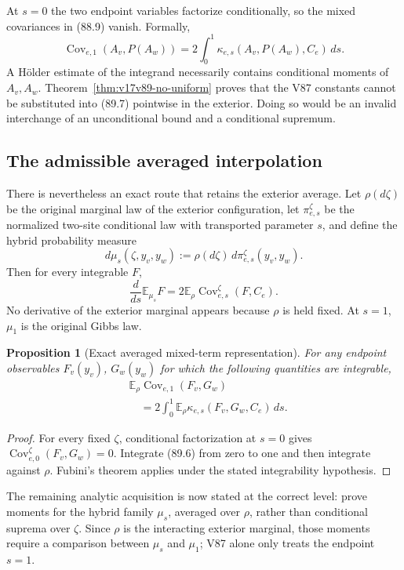 \documentclass[11pt]{article}
\newtheorem{proposition}[theorem]{Proposition}
\theoremstyle{remark}
\begin{document}
At \(s=0\) the two endpoint variables factorize conditionally, so the
mixed covariances in (88.9) vanish.  Formally,
\[
 \operatorname{Cov}_{e,1}(A_v,P(A_w))
 =2\int_0^1\kappa_{e,s}(A_v,P(A_w),C_e)\,ds.         \tag{89.7}
\]
A H\"older estimate of the integrand necessarily contains conditional
moments of \(A_v,A_w\).  Theorem~\ref{thm:v17v89-no-uniform} proves that
the V87 constants cannot be substituted into (89.7) pointwise in the
exterior.  Doing so would be an invalid interchange of an unconditional
bound and a conditional supremum.

\subsection{The admissible averaged interpolation}

There is nevertheless an exact route that retains the exterior
average.  Let \(\rho(d\zeta)\) be the original marginal law of the
exterior configuration, let \(\pi_{e,s}^{\zeta}\) be the normalized
two-site conditional law with transported parameter \(s\), and define
the hybrid probability measure
\[
 d\mu_s(\zeta,y_v,y_w)
 :=\rho(d\zeta)\,d\pi_{e,s}^{\zeta}(y_v,y_w).        \tag{89.8}
\]
Then for every integrable \(F\),
\[
 \frac d{ds}\mathbb E_{\mu_s}F
 =2\mathbb E_\rho
   \operatorname{Cov}_{e,s}^{\zeta}(F,C_e).         \tag{89.9}
\]
No derivative of the exterior marginal appears because \(\rho\) is
held fixed.  At \(s=1\), \(\mu_1\) is the original Gibbs law.

\begin{proposition}[Exact averaged mixed-term representation]
\label{prop:v17v89-averaged}
For any endpoint observables \(F_v(y_v)\), \(G_w(y_w)\) for which the
following quantities are integrable,
\[
\begin{aligned}
 &\mathbb E_\rho\operatorname{Cov}_{e,1}(F_v,G_w)\\
 &\quad=2\int_0^1\mathbb E_\rho
       \kappa_{e,s}(F_v,G_w,C_e)\,ds.                \tag{89.10}
\end{aligned}
\]
\end{proposition}

\begin{proof}
For every fixed \(\zeta\), conditional factorization at \(s=0\)
gives \(\operatorname{Cov}_{e,0}^{\zeta}(F_v,G_w)=0\).  Integrate
(89.6) from zero to one and then integrate against \(\rho\).  Fubini's
theorem applies under the stated integrability hypothesis.
\end{proof}

The remaining analytic acquisition is now stated at the correct
level: prove moments for the hybrid family \(\mu_s\), averaged over
\(\rho\), rather than conditional suprema over \(\zeta\).  Since
\(\rho\) is the interacting exterior marginal, those moments require a
comparison between \(\mu_s\) and \(\mu_1\); V87 alone only treats the
endpoint \(s=1\).
\end{document}
